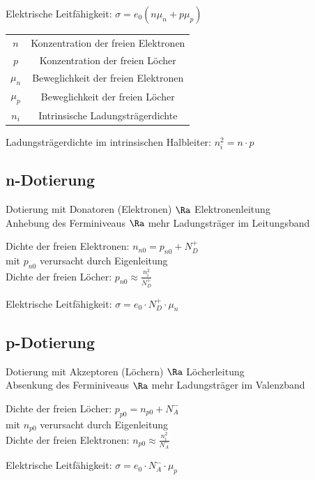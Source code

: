 \documentclass[german]{latex4ei_fs}
\begin{document}
\begin{sectionbox}
Elektrische Leitfähigkeit:
$\sigma = e_0 (n \mu_n + p \mu_p)$

\begin{symbolbox}
\begin{tabular}{cc}
$n$ & Konzentration der freien Elektronen \\
$p$ & Konzentration der freien Löcher \\
$\mu_n$ & Beweglichkeit der freien Elektronen \\
$\mu_p$ & Beweglichkeit der freien Löcher \\
$n_i$ & Intrinsische Ladungsträgerdichte
 \end{tabular}
\end{symbolbox}

Ladungsträgerdichte im intrinsischen Halbleiter:
 $n_i^2 = n \cdot p$
\end{sectionbox}
\begin{sectionbox}
 \subsection{n-Dotierung}
 Dotierung mit Donatoren (Elektronen) $\Ra$ Elektronenleitung \\

Anhebung des Ferminiveaus $\Ra$ mehr Ladungsträger im Leitungsband

Dichte der freien Elektronen: $n_{n0} = p_{n0} + N_D^+$ \\
mit $p_{n0}$ verursacht durch Eigenleitung \\

Dichte der freien Löcher: $p_{n0} \approx \frac{n_i^2}{N_D^+}$

Elektrische Leitfähigkeit: $\sigma = e_0 \cdot N_D^+ \cdot \mu_n$
\end{sectionbox}
\begin{sectionbox}

 \subsection{p-Dotierung}
Dotierung mit Akzeptoren (Löchern) $\Ra$ Löcherleitung \\

Absenkung des Ferminiveaus $\Ra$ mehr Ladungsträger im Valenzband

Dichte der freien Löcher: $p_{p0} = n_{p0} + N_A^-$ \\
mit $n_{p0}$ verursacht durch Eigenleitung \\

Dichte der freien Elektronen: $n_{p0} \approx \frac{n_i^2}{N_A^-}$

Elektrische Leitfähigkeit: $\sigma = e_0 \cdot N_A^- \cdot \mu_p$

\end{sectionbox}
\end{document}
